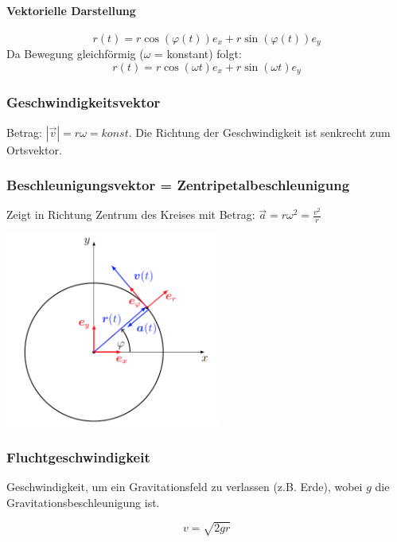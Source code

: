 \documentclass[7pt]{article}
\begin{document}
\begin{multicols*}{3}
\paragraph{Vektorielle Darstellung}
\begin{equation*}
	r(t) = r \cos(\varphi(t))e_x + r \sin(\varphi(t))e_y
\end{equation*}
Da Bewegung gleichf{\"o}rmig ($\omega$ = konstant) folgt:
\begin{equation*}
	r(t) = r \cos(\omega t)e_x + r \sin(\omega t)e_y
\end{equation*}


\subsubsection{Geschwindigkeitsvektor}
Betrag: $|\vec{v}| = r \omega = konst.$ \newline
Die Richtung der Geschwindigkeit ist senkrecht zum Ortsvektor.

\subsubsection{Beschleunigungsvektor = Zentripetalbeschleunigung}
Zeigt in Richtung Zentrum des Kreises mit Betrag: $\vec{a} = r \omega ^2 = \frac{v^2}{r}$

\begin{center}
	\includegraphics[width=200pt]{images/beschleunigung_radial}
\end{center}

\subsubsection{Fluchtgeschwindigkeit}

Geschwindigkeit, um ein Gravitationsfeld zu verlassen (z.B. Erde), wobei $g$ die Gravitationsbeschleunigung ist.

\begin{equation*}
	v = \sqrt{2gr}
\end{equation*}

\end{multicols*}
\end{document}
